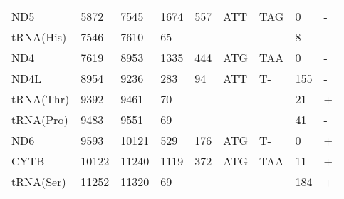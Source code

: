 \documentclass[../DISSERTACAO_MAIN.tex]{subfiles}
\begin{document}
\begin{longtable}{llllllllllllllllllllll}
			ND5          & 5872           & \multicolumn{2}{l}{7545}  & \multicolumn{2}{l}{1674}       & \multicolumn{3}{l}{557}                       & \multicolumn{3}{l}{ATT}           & \multicolumn{3}{l}{TAG}   & \multicolumn{3}{l}{0}           & \multicolumn{4}{l}{-}                  \\
			tRNA(His)    & 7546           & \multicolumn{2}{l}{7610}  & \multicolumn{2}{l}{65}         & \multicolumn{3}{l}{}                          & \multicolumn{3}{l}{}              & \multicolumn{3}{l}{}      & \multicolumn{3}{l}{8}           & \multicolumn{4}{l}{-}                  \\
			ND4          & 7619           & \multicolumn{2}{l}{8953}  & \multicolumn{2}{l}{1335}       & \multicolumn{3}{l}{444}                       & \multicolumn{3}{l}{ATG}           & \multicolumn{3}{l}{TAA}   & \multicolumn{3}{l}{0}           & \multicolumn{4}{l}{-}                  \\
			ND4L         & 8954           & \multicolumn{2}{l}{9236}  & \multicolumn{2}{l}{283}        & \multicolumn{3}{l}{94}                        & \multicolumn{3}{l}{ATT}           & \multicolumn{3}{l}{T-}    & \multicolumn{3}{l}{155}         & \multicolumn{4}{l}{-}                  \\
			tRNA(Thr)    & 9392           & \multicolumn{2}{l}{9461}  & \multicolumn{2}{l}{70}         & \multicolumn{3}{l}{}                          & \multicolumn{3}{l}{}              & \multicolumn{3}{l}{}      & \multicolumn{3}{l}{21}          & \multicolumn{4}{l}{+}                  \\
			tRNA(Pro)    & 9483           & \multicolumn{2}{l}{9551}  & \multicolumn{2}{l}{69}         & \multicolumn{3}{l}{}                          & \multicolumn{3}{l}{}              & \multicolumn{3}{l}{}      & \multicolumn{3}{l}{41}          & \multicolumn{4}{l}{-}                  \\
			ND6          & 9593           & \multicolumn{2}{l}{10121} & \multicolumn{2}{l}{529}        & \multicolumn{3}{l}{176}                       & \multicolumn{3}{l}{ATG}           & \multicolumn{3}{l}{T-}    & \multicolumn{3}{l}{0}           & \multicolumn{4}{l}{+}                  \\
			CYTB         & 10122          & \multicolumn{2}{l}{11240} & \multicolumn{2}{l}{1119}       & \multicolumn{3}{l}{372}                       & \multicolumn{3}{l}{ATG}           & \multicolumn{3}{l}{TAA}   & \multicolumn{3}{l}{11}          & \multicolumn{4}{l}{+}                  \\
			tRNA(Ser)    & 11252          & \multicolumn{2}{l}{11320} & \multicolumn{2}{l}{69}         & \multicolumn{3}{l}{}                          & \multicolumn{3}{l}{}              & \multicolumn{3}{l}{}      & \multicolumn{3}{l}{184}         & \multicolumn{4}{l}{+}                  \\

\end{longtable}
\end{document}
